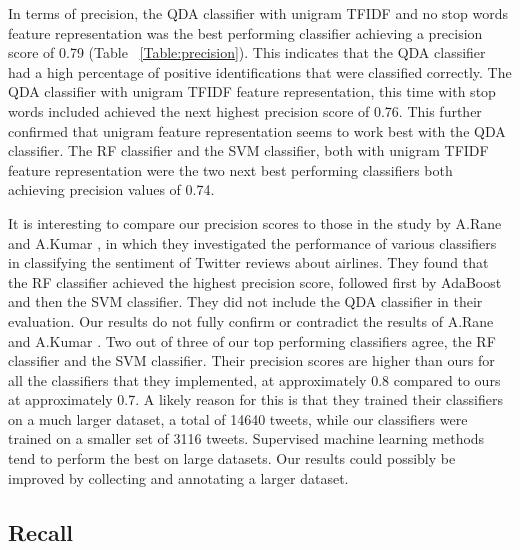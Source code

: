 In terms of precision, the QDA classifier with unigram TFIDF and no stop words feature representation was the best performing classifier achieving a precision score of 0.79 (Table ~\ref{Table:precision}). This indicates that the QDA classifier had a high percentage of positive identifications that were classified correctly. The QDA classifier with unigram TFIDF feature representation, this time with stop words included achieved the next highest precision score of 0.76. This further confirmed that unigram feature representation seems to work best with the QDA classifier. The RF classifier and the SVM classifier, both with unigram TFIDF feature representation were the two next best performing classifiers both achieving precision values of 0.74.

It is interesting to compare our precision scores to those in the study by A.Rane and A.Kumar \cite{Rane2018}, in which they investigated the performance of various classifiers in classifying the sentiment of Twitter reviews about airlines. They found that the RF classifier achieved the highest precision score, followed first by AdaBoost and then the SVM classifier. They did not include the QDA classifier in their evaluation. Our results do not fully confirm or contradict the results of A.Rane and A.Kumar \cite{Rane2018}. Two out of three of our top performing classifiers agree, the RF classifier and the SVM classifier. Their precision scores are higher than ours for all the classifiers that they implemented, at approximately 0.8 compared to ours at approximately 0.7. A likely reason for this is that they trained their classifiers on a much larger dataset, a total of 14640 tweets, while our classifiers were trained on a smaller set of 3116 tweets. Supervised machine learning methods tend to perform the best on large datasets. Our results could possibly be improved by collecting and annotating a larger dataset.

\subsection{Recall}

